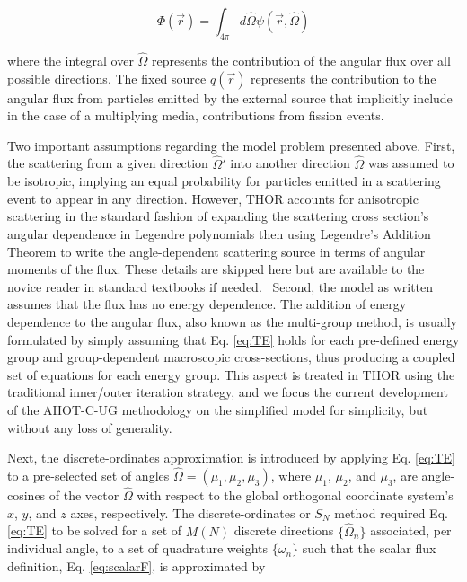 \begin{equation} \label{eq:scalarF}
    \Phi ( \Vec{r} ) = \int _{4 \pi} d \hat{\Omega } \psi ( \Vec{r} , \hat{\Omega } )
\end{equation}

\noindent where the integral over $\hat{\Omega }$ represents the contribution of the angular flux over all possible directions. The fixed source $ q ( \Vec{r} )$ represents the contribution to the angular flux from particles emitted by the external source that implicitly include in the case of a multiplying media, contributions from fission events.

Two important assumptions regarding the model problem presented above. First, the scattering from a given direction $\hat{\Omega} ' $ into another direction $\hat{\Omega}$ was assumed to be isotropic, implying an equal probability for particles emitted in a scattering event to appear in any direction. However, THOR accounts for anisotropic scattering in the standard fashion of expanding the scattering cross section's angular dependence in Legendre polynomials then using Legendre's Addition Theorem to write the angle-dependent scattering source in terms of angular moments of the flux. These details are skipped here but are available to the novice reader in standard textbooks if needed.~\cite{Lewis1993} Second, the model as written assumes that the flux has no energy dependence. The addition of energy dependence to the angular flux, also known as the multi-group method, is usually formulated by simply assuming that Eq. \ref{eq:TE} holds for each pre-defined energy group and group-dependent macroscopic cross-sections, thus producing a coupled set of equations for each energy group. This aspect is treated in THOR using the traditional inner/outer iteration strategy, and we focus the current development of the AHOT-C-UG methodology on the simplified model for simplicity, but without any loss of generality.

Next, the discrete-ordinates approximation is introduced by applying Eq. \ref{eq:TE} to a pre-selected set of angles $\hat{\Omega} = ( \mu_1 , \mu_2 , \mu_3 )$, where $\mu_1$, $\mu_2$, and $\mu_3$, are angle-cosines of the vector $\hat{\Omega}$ with respect to the global orthogonal coordinate
system's $x$, $y$, and $z$ axes, respectively. The discrete-ordinates or $S_N$ method required Eq. \ref{eq:TE} to be solved for a set of $M(N)$ discrete directions $\{ \hat{\Omega} _n \}$ associated, per individual angle, to a set of quadrature weights $\{ \omega_n \}$ such that the scalar flux definition, Eq. \ref{eq:scalarF}, is approximated by

